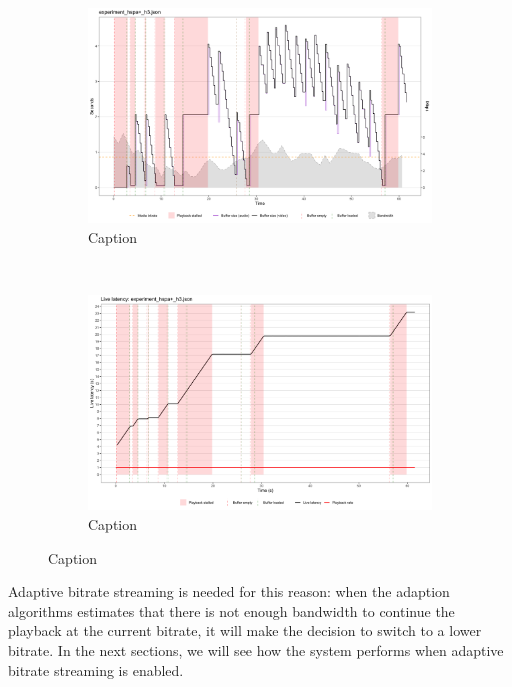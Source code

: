 \begin{figure}[h]
	\centering
	
	\begin{subfigure}[t]{0.45\textwidth}
		\centering
		\includegraphics[width=\textwidth]{res/eval_nonabr_hspa+_h3.png}
		\caption{Caption}
		\label{fig:eval_nonabr_hspa+_h3_buffer}
	\end{subfigure}%
	~ 
	\begin{subfigure}[t]{0.45\textwidth}
		\centering
		\includegraphics[width=\textwidth]{res/eval_nonabr_hspa+_h3_latency.png}
		\caption{Caption}
		\label{fig:eval_nonabr_hspa+_h3_waterfall}
	\end{subfigure}
	
	\caption{Caption}
	\label{fig:eval_nonabr_hspa+_h3}
\end{figure}

Adaptive bitrate streaming is needed for this reason: when the adaption algorithms estimates that there is not enough bandwidth to continue the playback at the current bitrate, it will make the decision to switch to a lower bitrate. In the next sections, we will see how the system performs when adaptive bitrate streaming is enabled.

